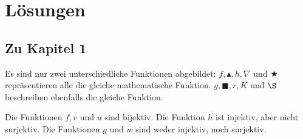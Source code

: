 \documentclass[12pt]{article}
\begin{document}
\section{Lösungen}
\subsection{Zu Kapitel 1}
\begin{solution}%
Es sind nur zwei unterschiedliche Funktionen abgebildet: $f, \blacktriangle, h, \nabla$ und $\bigstar$ repräsentieren alle die gleiche mathematische Funktion.
$g, \blacksquare, r, K$ und $\S$ beschreiben ebenfalls die gleiche Funktion.
\end{solution}

\begin{solution}
Die Funktionen $f, v$ und $u$ sind bijektiv. Die Funktion $h$ ist injektiv, aber nicht surjektiv. Die Funktionen $g$ und $w$ sind weder injektiv, noch surjektiv.
\end{solution}
\end{document}
